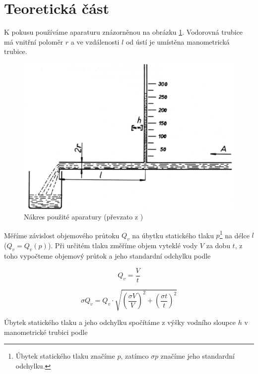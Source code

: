 \section*{Teoretická část}

K pokusu používáme aparaturu znázorněnou na obrázku \ref{obr:zfp-nakres}. Vodorovná trubice má vnitřní poloměr $r$ a ve vzdálenosti $l$ od ústí je umístěna manometrická trubice.

\begin{figure}[h] 
\centering
\includegraphics[width=\textwidth-2cm]{graficos/zfp}
\caption{Nákres použité aparatury (převzato z \cite{ZFP})}
\label{obr:zfp-nakres}
\end{figure}

Měříme závislost objemového průtoku $Q_v$ na úbytku statického tlaku $p$\footnote{Úbytek statického tlaku značíme $p$, zatímco $\sigma p$ značíme jeho standardní odchylku.} na délce $l$ ($Q_v=Q_v(p)$). Při určitém tlaku změříme objem vyteklé vody $V$ za dobu $t$, z toho vypočteme objemový průtok a jeho standardní odchylku podle

\begin{equation} \label{eq:Qv}
Q_v=\frac{V}{t}
\end{equation}


\begin{equation} \label{eq:chybaQv}
\sigma Q_v=Q_v \cdot \sqrt{      \left(\frac{\sigma V}{V} \right)^2+        \left(\frac{\sigma t}{t}\right)^2}
\end{equation}


Úbytek statického tlaku a jeho odchylku spočítáme z výšky vodního sloupce $h$ v manometrické trubici podle\cite{ZFP}

